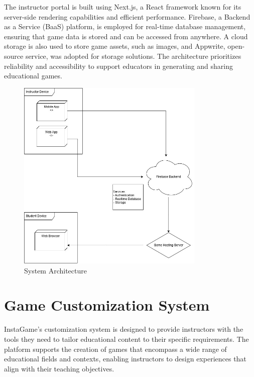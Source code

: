 The instructor portal is built using Next.js, a React framework known for its server-side rendering capabilities and efficient performance. Firebase, a Backend as a Service (BaaS) platform, is employed for real-time database management, ensuring that game data is stored and can be accessed from anywhere. A cloud storage is also used to store game assets, such as images, and Appwrite, open-source service, was adopted for storage solutions. The architecture prioritizes reliability and accessibility to support educators in generating and sharing educational games.

\begin{figure}
	\centering
	\includegraphics[width=0.8\textwidth]{figures/Deployment_UML.jpg}
	\caption{System Architecture}
	\label{fig:architecture}
\end{figure}

\section{Game Customization System}

InstaGame’s customization system is designed to provide instructors with the tools they need to tailor educational content to their specific requirements. The platform supports the creation of games that encompass a wide range of educational fields and contexts, enabling instructors to design experiences that align with their teaching objectives.

